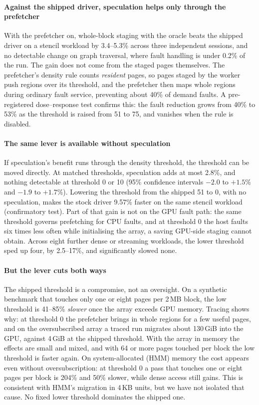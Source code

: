 \paragraph{Against the shipped driver, speculation helps only through the prefetcher}
With the prefetcher on, whole-block staging with the oracle beats the shipped
driver on a stencil workload by 3.4--5.3\% across three independent sessions,
and no detectable change on graph traversal, where fault handling is under
0.2\% of the run. The gain does not come from the
staged pages themselves. The prefetcher's density rule counts \emph{resident}
pages, so pages staged by the worker push regions over its threshold, and the
prefetcher then maps whole regions during ordinary fault service, preventing
about 40\% of demand faults. A pre-registered dose--response test confirms
this: the fault reduction grows from 40\% to 53\% as the threshold is raised from
51 to 75, and vanishes when the rule is disabled.

\paragraph{The same lever is available without speculation}
If speculation's benefit runs through the density threshold, the threshold can
be moved directly. At matched thresholds, speculation adds at most 2.8\%, and
nothing detectable at threshold 0 or 10 (95\% confidence intervals $-2.0$ to
$+1.5\%$ and $-1.9$ to $+1.7\%$). Lowering the threshold from the shipped
51 to 0, with no speculation, makes the stock driver 9.57\% faster on the same
stencil workload (confirmatory test). Part of that gain is not on the GPU fault
path: the same threshold governs prefetching for CPU faults, and at threshold 0
the host faults six times less often while initialising the array, a saving
GPU-side staging cannot obtain. Across eight further dense or streaming workloads, the lower threshold sped up
four, by 2.5--17\%, and significantly slowed none.

\paragraph{But the lever cuts both ways}
The shipped threshold is a compromise, not an oversight. On a synthetic
benchmark that touches only one or eight pages per 2\,MB block, the low
threshold is 41--85\% \emph{slower} once the array exceeds GPU memory. Tracing
shows why: at threshold 0 the prefetcher brings in whole regions for a few
useful pages, and on the oversubscribed array a traced run migrates about
130\,GiB into the GPU, against 4\,GiB at the shipped threshold. With the array
in memory the effects are small and mixed, and with 64 or more pages touched per
block the low threshold is faster again. On system-allocated (HMM) memory the cost
appears even without oversubscription: at threshold 0 a pass that touches one or
eight pages per block is 204\% and 50\% slower, while dense access still
gains. This is consistent with HMM's migration in 4\,KB units, but we have not
isolated that cause. No fixed lower threshold dominates the shipped one.

